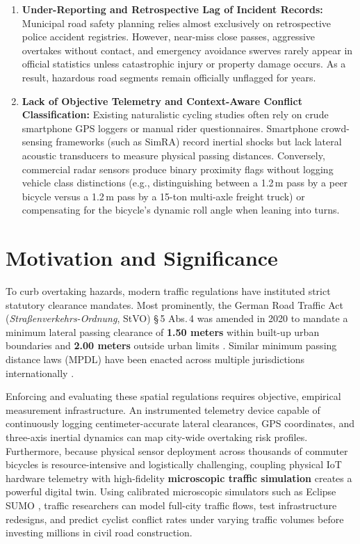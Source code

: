 \begin{enumerate}
    \item \textbf{Under-Reporting and Retrospective Lag of Incident Records:} Municipal road safety planning relies almost exclusively on retrospective police accident registries. However, near-miss close passes, aggressive overtakes without contact, and emergency avoidance swerves rarely appear in official statistics unless catastrophic injury or property damage occurs. As a result, hazardous road segments remain officially unflagged for years.
    \item \textbf{Lack of Objective Telemetry and Context-Aware Conflict Classification:} Existing naturalistic cycling studies often rely on crude smartphone GPS loggers or manual rider questionnaires. Smartphone crowd-sensing frameworks (such as SimRA) record inertial shocks but lack lateral acoustic transducers to measure physical passing distances. Conversely, commercial radar sensors produce binary proximity flags without logging vehicle class distinctions (e.g., distinguishing between a 1.2\,m pass by a peer bicycle versus a 1.2\,m pass by a 15-ton multi-axle freight truck) or compensating for the bicycle's dynamic roll angle when leaning into turns.
\end{enumerate}

\section{Motivation and Significance}
To curb overtaking hazards, modern traffic regulations have instituted strict statutory clearance mandates. Most prominently, the German Road Traffic Act (\textit{Stra{\ss}en\-verkehrs-Ordnung}, StVO) \S\,5 Abs.\,4 was amended in 2020 to mandate a minimum lateral passing clearance of \textbf{1.50 meters} within built-up urban boundaries and \textbf{2.00 meters} outside urban limits \cite{stvo2020germany}. Similar minimum passing distance laws (MPDL) have been enacted across multiple jurisdictions internationally \cite{beck2019passing}.

Enforcing and evaluating these spatial regulations requires objective, empirical measurement infrastructure. An instrumented telemetry device capable of continuously logging centimeter-accurate lateral clearances, GPS coordinates, and three-axis inertial dynamics can map city-wide overtaking risk profiles. Furthermore, because physical sensor deployment across thousands of commuter bicycles is resource-intensive and logistically challenging, coupling physical IoT hardware telemetry with high-fidelity \textbf{microscopic traffic simulation} creates a powerful digital twin. Using calibrated microscopic simulators such as Eclipse SUMO \cite{lopez2018microscopic}, traffic researchers can model full-city traffic flows, test infrastructure redesigns, and predict cyclist conflict rates under varying traffic volumes before investing millions in civil road construction.

